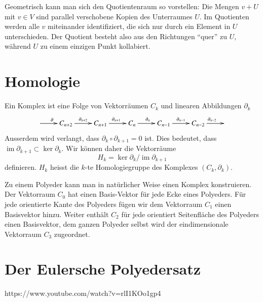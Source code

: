 Geometrisch kann man sich den Quotientenraum so vorstellen:
Die Mengen $v+U$ mit $v\in V$ sind parallel verschobene Kopien des
Unterraumes $U$.
Im Quotienten werden alle $v$ miteinander identifiziert, die sich nur
durch ein Element in $U$ unterschieden.
Der Quotient besteht also aus den Richtungen ``quer'' zu $U$, während 
$U$ zu einem einzigen Punkt kollabiert.

\section{Homologie}
Ein Komplex ist eine Folge von Vektorräumen $C_k$ und linearen Abbildungen
$\partial_k$
\[
\xymatrix{
*+\txt{} \ar[r]^{\partial}
	&C_{n+2} \ar[r]^{\partial_{n+2}}
		&C_{n+1} \ar[r]^{\partial_{n+1}}
			&C_{n} \ar[r]^{\partial_n}
				&C_{n-1} \ar[r]^{\partial_{n-1}}
					&C_{n-2} \ar[r]^{\partial_{n-2}}
						&*+\txt{}
}
\]
Ausserdem wird verlangt, dass $\partial_{k} \circ \partial_{k+1}=0$ ist.
Dies bedeutet, dass
$\operatorname{im}\partial_{k+1}\subset \operatorname{ker}\partial_{k}$.
Wir können daher die Vektorräume
\[
H_k = \operatorname{ker}\partial_k/\operatorname{im}\partial_{k+1}
\]
definieren.
$H_k$ heisst die $k$-te Homologiegruppe des Komplexes $(C_k,\partial_k)$.

Zu einem Polyeder kann man in natürlicher Weise einen Komplex konstruieren.
Der Vektorraum $C_0$ hat einen Basis-Vektor für jede Ecke eines Polyeders.
Für jede orientierte Kante des Polyeders fügen wir dem Vektorraum $C_1$
einen Basisvektor hinzu. 
Weiter enthält $C_2$ für jede orientiert Seitenfläche des Polyeders
einen Basisvektor, dem ganzen Polyeder selbst wird der eindimensionale
Vektorraum $C_3$ zugeordnet.

\section{Der Eulersche Polyedersatz}




https://www.youtube.com/watch?v=rlI1KOo1gp4








